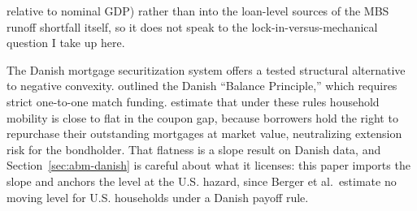 \documentclass[12pt]{article}
\begin{document}
relative to nominal GDP) rather than into the loan-level sources of the MBS runoff shortfall itself, so it does not speak to the lock-in-versus-mechanical question I take up here.

The Danish mortgage securitization system offers a tested structural alternative to negative convexity. \citet{berg2018} outlined the Danish ``Balance Principle,'' which requires strict one-to-one match funding. \citet[\S3.2.3]{berger2026} estimate that under these rules household mobility is close to flat in the coupon gap, because borrowers hold the right to repurchase their outstanding mortgages at market value, neutralizing extension risk for the bondholder. That flatness is a slope result on Danish data, and Section~\ref{sec:abm-danish} is careful about what it licenses: this paper imports the slope and anchors the level at the U.S. hazard, since Berger et al.\ estimate no moving level for U.S. households under a Danish payoff rule.
\end{document}
